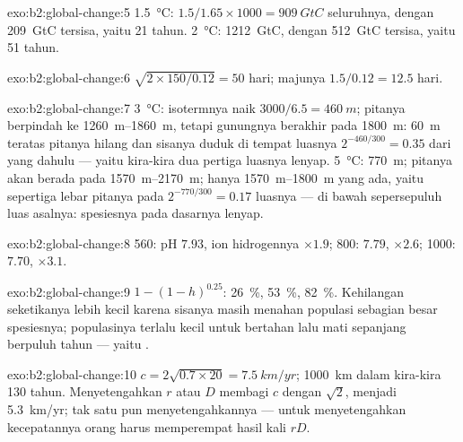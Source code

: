 \begin{solution}{exo:b2:global-change:5}
\qty{1.5}{\celsius}: $1.5/1.65\times 1000 = \qty{909}{GtC}$ seluruhnya,
dengan \qty{209}{GtC} tersisa, yaitu 21 tahun. \qty{2}{\celsius}:
\qty{1212}{GtC}, dengan \qty{512}{GtC} tersisa, yaitu 51 tahun.
\end{solution}

\begin{solution}{exo:b2:global-change:6}
$\sqrt{2\times 150/0.12} = 50$ hari; majunya $1.5/0.12 = 12.5$
hari.
\end{solution}

\begin{solution}{exo:b2:global-change:7}
\qty{3}{\celsius}: isotermnya naik $3000/6.5 = \qty{460}{m}$; pitanya
berpindah ke \qtyrange{1260}{1860}{m}, tetapi gunungnya berakhir pada
\qty{1800}{m}: \qty{60}{m} teratas pitanya hilang dan sisanya duduk di
tempat luasnya $2^{-460/300} = 0.35$ dari yang dahulu --- yaitu
kira-kira dua pertiga luasnya lenyap. \qty{5}{\celsius}: \qty{770}{m};
pitanya akan berada pada \qtyrange{1570}{2170}{m}; hanya
\qtyrange{1570}{1800}{m} yang ada, yaitu sepertiga lebar pitanya pada
$2^{-770/300} = 0.17$ luasnya --- di bawah sepersepuluh luas asalnya:
spesiesnya pada dasarnya lenyap.
\end{solution}

\begin{solution}{exo:b2:global-change:8}
560: pH $7.93$, ion hidrogennya $\times 1.9$; 800: $7.79$, $\times
2.6$; 1000: $7.70$, $\times 3.1$.
\end{solution}

\begin{solution}{exo:b2:global-change:9}
$1 - (1 - h)^{0.25}$: \qty{26}{\%}, \qty{53}{\%}, \qty{82}{\%}.
Kehilangan seketikanya lebih kecil karena sisanya masih menahan
populasi sebagian besar spesiesnya; populasinya terlalu kecil untuk
bertahan lalu mati sepanjang berpuluh tahun --- yaitu .
\end{solution}

\begin{solution}{exo:b2:global-change:10}
$c = 2\sqrt{0.7\times 20} = \qty{7.5}{km/yr}$; \qty{1000}{km} dalam
kira-kira 130 tahun. Menyetengahkan $r$ atau $D$ membagi $c$ dengan
$\sqrt 2$, menjadi \qty{5.3}{km/yr}; tak satu pun menyetengahkannya ---
untuk menyetengahkan kecepatannya orang harus memperempat hasil kali $rD$.
\end{solution}

